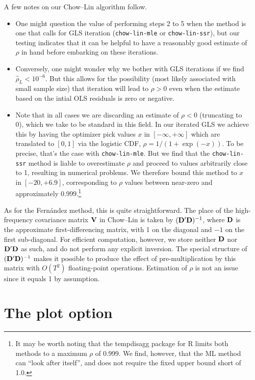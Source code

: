 A few notes on our Chow--Lin algorithm follow.
\begin{itemize}
\item One might question the value of performing steps 2 to 5 when the
  method is one that calls for GLS iteration (\texttt{chow-lin-mle} or
  \texttt{chow-lin-ssr}), but our testing indicates that it can be
  helpful to have a reasonably good estimate of $\rho$ in hand before
  embarking on these iterations.
\item Conversely, one might wonder why we bother with GLS iterations
  if we find $\hat{\rho}_L < 10^{-6}$. But this allows for the
  possibility (most likely associated with small sample size) that
  iteration will lead to $\rho > 0$ even when the estimate based on
  the intial OLS residuals is zero or negative.
\item Note that in all cases we are discarding an estimate of
  $\rho < 0$ (truncating to 0), which we take to be standard in this
  field. In our iterated GLS we achieve this by having the optimizer
  pick values $x$ in $[-\infty, +\infty]$ which are translated to
  $[0,1]$ via the logistic CDF, $\rho = 1/(1 + \exp(-x))$. To be
  precise, that's the case with \texttt{chow-lin-mle}. But we find
  that the \texttt{chow-lin-ssr} method is liable to overestimate
  $\rho$ and proceed to values arbitrarily close to 1, resulting in
  numerical problems. We therefore bound this method to $x$ in
  $[-20, +6.9]$, corresponding to $\rho$ values between near-zero and
  approximately 0.999.\footnote{It may be worth noting that the
    \textsf{tempdisagg} package for R limits both methods to a maximum
    $\rho$ of 0.999. We find, however, that the ML method can ``look
    after itself'', and does not require the fixed upper bound short
    of 1.0.}
\end{itemize}

As for the Fernández method, this is quite straightforward. The place
of the high-frequency covariance matrix $\mathbf{V}$ in Chow--Lin is taken by
$(\mathbf{D}'\mathbf{D})^{-1}$, where $\mathbf{D}$ is the approximate first-differencing
matrix, with 1 on the diagonal and $-1$ on the first sub-diagonal. For
efficient computation, however, we store neither $\mathbf{D}$ nor $\mathbf{D}'\mathbf{D}$
as such, and do not perform any explicit inversion. The special
structure of $(\mathbf{D}'\mathbf{D})^{-1}$ makes it possible to produce the effect
of pre-multiplication by this matrix with ${O}(T^2)$ floating-point
operations. Estimation of $\rho$ is not an issue since it equals 1 by
assumption.

\section{The plot option}
\label{sec:tdisagg-plot}

